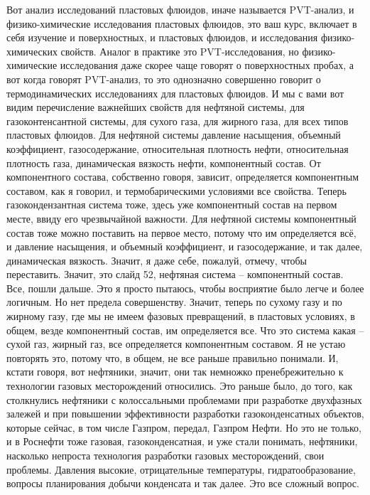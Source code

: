 \documentclass[main.tex]{subfiles}
\begin{document}
Вот анализ исследований пластовых флюидов, иначе называется PVT-анализ, и физико-химические исследования пластовых флюидов, это ваш курс, включает в себя изучение и поверхностных, и пластовых флюидов, и исследования физико-химических свойств.
Аналог в практике это PVT-исследования, но физико-химические исследования даже скорее чаще говорят о поверхностных пробах, а вот когда говорят PVT-анализ, то это однозначно совершенно говорит о термодинамических исследованиях для пластовых флюидов.
И мы с вами вот видим перечисление важнейших свойств для нефтяной системы, для газоконтенсантной системы, для сухого газа, для жирного газа, для всех типов пластовых флюидов.
Для нефтяной системы давление насыщения, объемный коэффициент, газосодержание, относительная плотность нефти, относительная плотность газа, динамическая вязкость нефти, компонентный состав.
От компонентного состава, собственно говоря, зависит, определяется компонентным составом, как я говорил, и термобарическими условиями все свойства.
Теперь газокондензантная система тоже, здесь уже компонентный состав на первом месте, ввиду его чрезвычайной важности.
Для нефтяной системы компонентный состав тоже можно поставить на первое место, потому что им определяется всё, и давление насыщения, и объемный коэффициент, и газосодержание, и так далее, динамическая вязкость.
Значит, я даже себе, пожалуй, отмечу, чтобы переставить.
Значит, это слайд 52, нефтяная система -- компонентный состав.
Все, пошли дальше.
Это я просто пытаюсь, чтобы восприятие было легче и более логичным.
Но нет предела совершенству.
Значит, теперь по сухому газу и по жирному газу, где мы не имеем фазовых превращений, в пластовых условиях, в общем, везде компонентный состав, им определяется все.
Что это система какая -- сухой газ, жирный газ, все определяется компонентным составом.
Я не устаю повторять это, потому что, в общем, не все раньше правильно понимали.
И, кстати говоря, вот нефтяники, значит, они так немножко пренебрежительно к технологии газовых месторождений относились.
Это раньше было, до того, как столкнулись нефтяники с колоссальными проблемами при разработке двухфазных залежей и при повышении эффективности разработки газоконденсатных объектов, которые сейчас, в том числе Газпром, передал, Газпром Нефти.
Но это не только, и в Роснефти тоже газовая, газоконденсатная, и уже стали понимать, нефтяники, насколько непроста технология разработки газовых месторождений, свои проблемы.
Давления высокие, отрицательные температуры, гидратообразование, вопросы планирования добычи конденсата и так далее.
Это все сложный вопрос.
\end{document}

